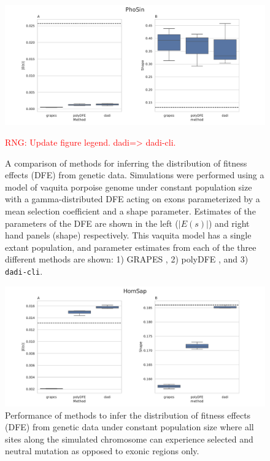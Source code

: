 \documentclass[hidelinks]{article}
\newcommand{\dadicli}{\texttt{dadi-cli}\xspace}
\newcommand{\rngcomment}[1]{\textcolor{red}{RNG: #1}}
\begin{document}
\begin{figure}
    \centering
    \includegraphics[width=\textwidth]{figures/PhoSin/Constant/PhoSin_Constant_Gamma_R22_Phocoena_sinus.mPhoSin1.pri.110_exons_DFE_plot.pdf}
    \caption{
    \label{fig:vaquita-dfe.constant}
    A comparison of methods for inferring the distribution of fitness effects (DFE) from genetic data.
    Simulations were performed using a model of vaquita porpoise genome under constant population size with a gamma-distributed DFE
    acting on exons parameterized by a mean selection coefficient and a shape parameter. Estimates of the 
    parameters of the DFE are shown in the left ($\lvert E(s) \rvert $) and right hand panels (shape) respectively.
    This vaquita model has a single extant population, and parameter estimates from each
    of the three different methods are shown: 1) GRAPES \citep{galtier2016adaptive}, 2) polyDFE \citep{tataru2020polydfe},
    and 3) \dadicli \citep{Huang2023}.}
    \rngcomment{Update figure legend. dadi=> dadi-cli.}
\end{figure}

\begin{figure}[h]
    \centering
    \includegraphics[width=\textwidth]{figures/HomSap/Constant/HomSap_Constant_Gamma_K17_all_sites_DFE_plot}
    \caption{
    \label{fig:homsap-dfe.constant.all_sites}
    Performance of methods to infer the distribution of fitness effects (DFE) from genetic data
    under constant population size  where all sites along the simulated chromosome can experience selected and neutral mutation
    as opposed to exonic regions only.
    }
\end{figure}
\end{document}
